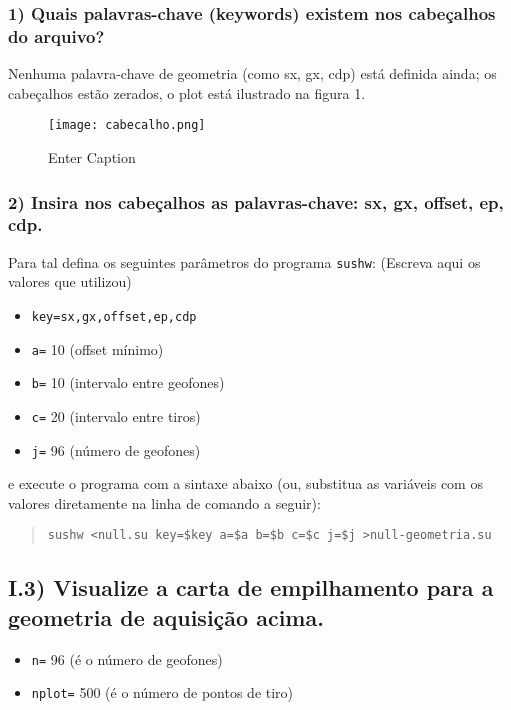 \documentclass[12pt,a4paper]{article}
\begin{document}
\subsubsection{1) Quais palavras-chave (keywords) existem nos cabeçalhos do arquivo?}

Nenhuma palavra-chave de geometria (como sx, gx, cdp) está definida ainda; os cabeçalhos estão zerados, o plot está ilustrado na figura 1.


\begin{figure}[h]
    \centering
    \texttt{[image: cabecalho.png]}
    \caption{Enter Caption}
    \label{fig:placeholder}
\end{figure}


\subsubsection{2) Insira nos cabeçalhos as palavras-chave: sx, gx, offset, ep, cdp.}
Para tal defina os seguintes parâmetros do programa \texttt{sushw}: (Escreva aqui os valores que utilizou)

\begin{itemize}[leftmargin=2cm]
    \item \texttt{key=sx,gx,offset,ep,cdp}
    \item \texttt{a=} 10 (offset mínimo)
    \item \texttt{b=} 10 (intervalo entre geofones)
    \item \texttt{c=} 20 (intervalo entre tiros)
    \item \texttt{j=} 96 (número de geofones) 
\end{itemize}

e execute o programa com a sintaxe abaixo (ou, substitua as variáveis com os valores diretamente na linha de comando a seguir):

\begin{quote}
\texttt{sushw <null.su key=\$key a=\$a b=\$b c=\$c j=\$j >null-geometria.su}
\end{quote}

\subsection{I.3) Visualize a carta de empilhamento para a geometria de aquisição acima.}

\begin{itemize}[leftmargin=2cm]
    \item \texttt{n=} 96 (é o número de geofones)
    \item \texttt{nplot=} 500 (é o número de pontos de tiro)
\end{itemize}
\end{document}
